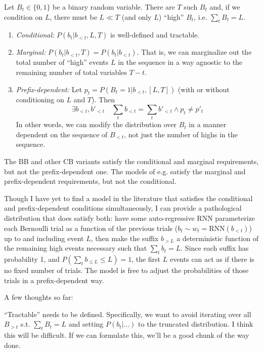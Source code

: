 \documentclass{article}
\begin{document}
Let $B_t \in \{0,1\}$ be a binary random variable. There are $T$ such $B_t$
and, if we condition on $L$, there must be $L \ll T$ (and only $L$) ``high''
$B_t$, i.e. $\sum_t B_t = L$.
%
\begin{enumerate}
    \item \emph{Conditional:} $P(b_t|b_{<t},L,T)$ is well-defined and
          tractable.
    \item \emph{Marginal:} $P(b_t|b_{<t}, T) = P(b_t|b_{<t})$. That is, we can
          marginalize out the total number of ``high'' events $L$ in the
          sequence in a way agnostic to the remaining number of total variables
          $T - t$.
    \item \emph{Prefix-dependent:} Let $p_t = P(B_t = 1|b_{<t}, [L, T])$
          (with or without conditioning on $L$ and $T$). Then
          \begin{equation*}
            \exists b_{<t}, b'_{<t} \quad
                \sum_t b_{<t} = \sum_t b'_{<t} \land p_t \neq p'_t
          \end{equation*}
          In other words, we can modify the distribution over $B_t$ in a manner
          dependent on the sequence of $B_{<t}$, not just the number of highs
          in the sequence.
\end{enumerate}
%
The BB and other CB variants satisfy the conditional and marginal requirements,
but not the prefix-dependent one. The models of e.g.
\citet{luoLearningOnlineAlignments2017,raffelOnlineLineartimeAttention2017}
satisfy the marginal and prefix-dependent requirements, but not the
conditional.

Though I have yet to find a model in the literature that satisfies the
conditional and prefix-dependent conditions simultaneously, I can provide a
pathological distribution that does satisfy both: have some auto-regressive RNN
parameterize each Bernoulli trial as a function of the previous trials ($b_t
\sim w_t = \text{RNN}(b_{<t})$) up to and including event $L$, then make the
suffix $b_{>L}$ a deterministic function of the remaining high events necessary
such that $\sum_t b_t = L$. Since each suffix has probability 1, and $P(\sum_t
b_{\leq L} \leq L) = 1$, the first $L$ events can act as if there is no fixed
number of trials. The model is free to adjust the probabilities of those trials
in a prefix-dependent way.

A few thoughts so far:

``Tractable'' needs to be defined. Specifically, we want to avoid iterating
over all $B_{>t}$ s.t. $\sum_t B_t = L$ and setting $P(b_t|\ldots)$ to the
truncated distribution. I think this will be difficult. If we can formulate
this, we'll be a good chunk of the way done.
\end{document}
